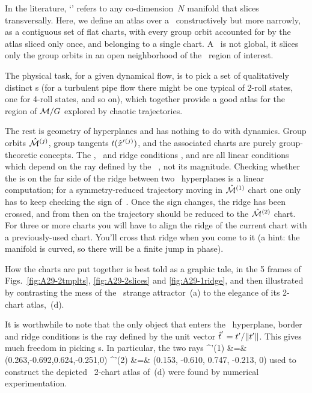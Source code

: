 \documentclass[aip,cha,reprint,
secnumarabic,
nofootinbib, tightenlines,
nobibnotes, showkeys, showpacs,
groupedaddress
]{revtex4-1}
\begin{document}


In the literature, `\slice' refers to any
co-dimension~$N$ manifold that slices transversally. Here, we define
an atlas over a \slice\ constructively but more narrowly, as a contiguous
set of flat charts, with every group orbit accounted for by the
atlas sliced only once, and belonging to a single chart. A \slice\ is not
global, it slices only the group orbits in an open neighborhood of the
\statesp\ region of interest.

The physical task, for a given dynamical flow, is to pick a set of
qualitatively distinct {\template s} (for a turbulent pipe
flow there might be one typical of 2-roll states, one for 4-roll states, and so on),
which together provide a good atlas for the region of ${\cal M}/G$
explored by chaotic trajectories.

The rest is geometry of hyperplanes and has nothing to do with dynamics.
Group orbits $\hat{\cal M}{}^{(j)}$, group tangents
$t({\hat{x}'}{}^{(j)})$, and the associated charts are purely
group-theoretic concepts. The \slice, \chartBord\ and ridge conditions
,  and  are all linear
conditions which depend on the ray defined by the \template\ \slicep, not
its magnitude. Checking whether the {\chartBord} is on the far side of
the ridge between two \slice\ hyperplanes is a linear computation; for a
symmetry-reduced trajectory moving in $\hat{\cal M}{}^{(1)}$ chart one only has
to keep checking the sign of
\beq
{}
\,.
Once the sign changes, the ridge has been crossed, and from then on
the trajectory should be reduced to the $\pSRed{}^{(2)}$ chart.
For three or more charts you will have to align the ridge of the current
chart with a previously-used chart. You'll cross that ridge when you come
to it (a hint: the manifold is curved, so there will be a finite jump in
phase).

How the charts are put together is best told as a graphic tale, in the 5
frames of Figs.~\ref{fig:A29-2tmplts}, \ref{fig:A29-2slices} and
\ref{fig:A29-1ridge}, and then illustrated by contrasting the mess of the
\cLe\ strange attractor \,(a) to the elegance of
its 2-chart atlas, \,(d).

It is worthwhile to note that the only object that enters the \slice\
hyperplane, border and ridge conditions is the ray defined by the unit
vector $\hat{t}{}^{'}= \sliceTan{}/\Norm{\sliceTan{}}$. This gives much
freedom in picking \template s. In particular, the two rays
\bea
{}^{'(1)} &=& (0.263,-0.692,0.624,-0.251,0)
    \continue
{}^{'(2)} &=& (0.153, -0.610, 0.747, -0.213, 0)
\label{DanielTmpls2}
\eea
used to construct the depicted \cLe\ 2-chart atlas of
\,(d) were found by numerical experimentation.
\end{document}
